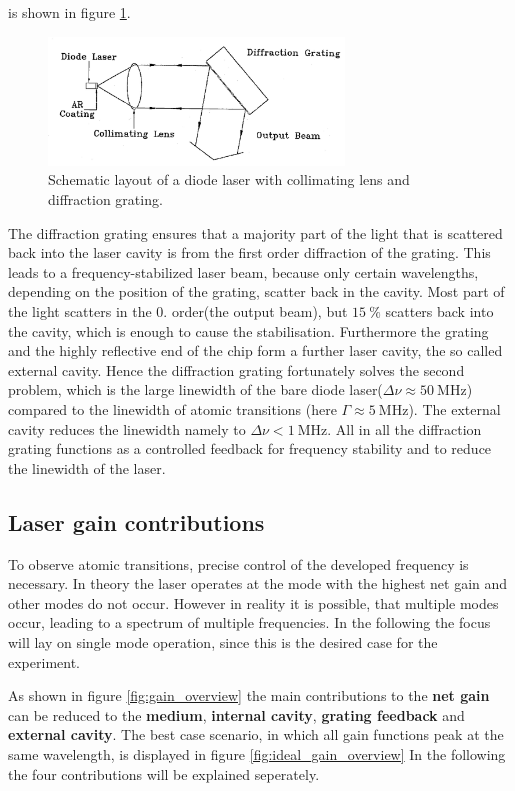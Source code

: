 is shown in figure \ref{fig:aufbau}.
\begin{figure}
  \centering
  \includegraphics[width=0.7\textwidth]{aufbau.png}
  \caption{Schematic layout of a diode laser with collimating lens and diffraction grating.\cite{V60}}
  \label{fig:aufbau}
\end{figure}

The diffraction grating ensures that a majority part of
the light that is scattered back into the laser cavity is from the first order
diffraction of the grating. This leads to
a frequency-stabilized laser beam, because only certain wavelengths,
depending on the position
of the grating, scatter back in the cavity.
Most part of the light scatters in the 0. order(the output beam), but $\SI{15}{\percent}$ scatters back into
the cavity, which is enough to cause the stabilisation.
Furthermore the grating and the highly reflective end of the chip form a
further laser cavity,
the so called external cavity.
Hence the diffraction grating fortunately solves the second
problem, which is the large linewidth of the bare
diode laser($\Delta \nu \approx \SI{50}{\mega\hertz}$)
compared to the linewidth of atomic transitions
(here $\Gamma \approx \SI{5}{\mega\hertz}$).
The external cavity
reduces the linewidth namely to $\Delta \nu < \SI{1}{\mega\hertz}$.
All in all the diffraction grating
functions as a controlled feedback for frequency stability
and to reduce the linewidth of the laser.


\subsection{Laser gain contributions}
\label{subsec:}
To observe atomic transitions, precise control
of the developed frequency is necessary.
In theory the laser operates at the mode with the highest net gain
and other modes do not occur.
However in reality it is possible, that multiple modes occur, leading
to a spectrum of multiple frequencies. In the following the focus will
lay on single mode operation, since this is the desired case
for the experiment.

As shown in figure \ref{fig:gain_overview} the main contributions
to the \textbf{net gain} can be reduced to
the \textbf{medium}, \textbf{internal cavity}, \textbf{grating feedback}
and  \textbf{external cavity}.
The best case scenario, in which all gain functions peak at the
same wavelength, is displayed in figure \ref{fig:ideal_gain_overview}
In the following the four contributions will be explained seperately.


